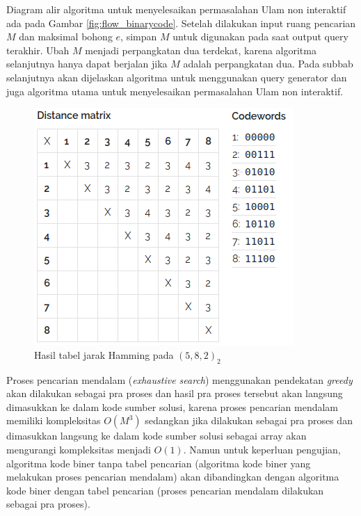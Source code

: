 Diagram alir algoritma untuk menyelesaikan permasalahan Ulam non interaktif ada pada Gambar \ref{fig:flow_binarycode}. Setelah dilakukan input ruang pencarian $M$ dan maksimal bohong $e$, simpan $M$ untuk digunakan pada saat output query terakhir. Ubah $M$ menjadi perpangkatan dua terdekat, karena algoritma selanjutnya hanya dapat berjalan jika $M$ adalah perpangkatan dua. Pada subbab selanjutnya akan dijelaskan algoritma untuk menggunakan query generator dan juga algoritma utama untuk menyelesaikan permasalahan Ulam non interaktif.

\begin{figure}
\centering
\includegraphics[scale=0.7]{../img/hamming2.png}
\caption{Hasil tabel jarak Hamming pada $(5,8,2)_2$}
\label{fig:hamming2}
\end{figure}

Proses pencarian mendalam (\textit{exhaustive search}) menggunakan pendekatan \textit{greedy} akan dilakukan sebagai pra proses dan hasil pra proses tersebut akan langsung dimasukkan ke dalam kode sumber solusi, karena proses pencarian mendalam memiliki kompleksitas $O(M^3)$ sedangkan jika dilakukan sebagai pra proses dan dimasukkan langsung ke dalam kode sumber solusi sebagai array akan mengurangi kompleksitas menjadi $O(1)$. Namun untuk keperluan pengujian, algoritma kode biner tanpa tabel pencarian (algoritma kode biner yang melakukan proses pencarian mendalam) akan dibandingkan dengan algoritma kode biner dengan tabel pencarian (proses pencarian mendalam dilakukan sebagai pra proses).

